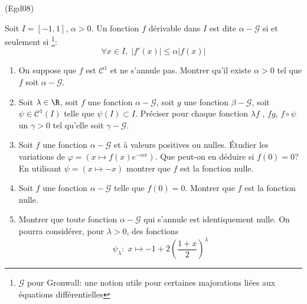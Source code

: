 \begin{tiny}(Egd08)\end{tiny} Soit $I = [-1,1]$, $\alpha >0$. Un fonction $f$ dérivable dans $I$ est dite $\alpha - \mathcal{G}$ si et seulement si \footnote{$\mathcal{G}$ pour Gronwall: une notion utile pour certaines majorations liées aux équations différentielles}:
\begin{displaymath}
  \forall x\in I,\; \left| f'(x) \right| \leq \alpha \left| f(x) \right|
\end{displaymath}
\begin{enumerate}
  \item On suppose que $f$ est $\mathcal{C}^1$ et ne s'annule pas. Montrer qu'il existe $\alpha >0$ tel que  $f$ soit $\alpha-\mathcal{G}$.
  \item Soit $\lambda \in \R$, soit $f$ une fonction $\alpha - \mathcal{G}$, soit $g$ une fonction $\beta - \mathcal{G}$, soit $\psi\in \mathcal{C}^1(I)$ telle que $\psi(I)\subset I$. Préciser pour chaque fonction $\lambda f$ , $fg$, $f \circ \psi$ un $\gamma >0$ tel qu'elle soit $\gamma - \mathcal{G}$.
  \item Soit $f$ une fonction $\alpha - \mathcal{G}$ et à valeurs positives ou nulles. \'Etudier les variations de $\varphi = \left( x\mapsto f(x)e^{-\alpha x}\right)$.\newline 
Que peut-on en déduire si $f(0)=0$? En utilisant $\psi = \left(  x\mapsto -x\right)$ montrer que $f$ est la fonction nulle.
  \item Soit $f$ une fonction $\alpha - \mathcal{G}$ telle que $f(0)=0$. Montrer que $f$ est la fonction nulle.
  \item Montrer que toute fonction $\alpha - \mathcal{G}$ qui s'annule est identiquement nulle. On pourra considérer, pour $\lambda > 0$, des fonctions 
\begin{displaymath}
  \psi_\lambda:\; x\mapsto -1 + 2 \left( \frac{1 + x}{2}\right)^\lambda
\end{displaymath}
\end{enumerate}
